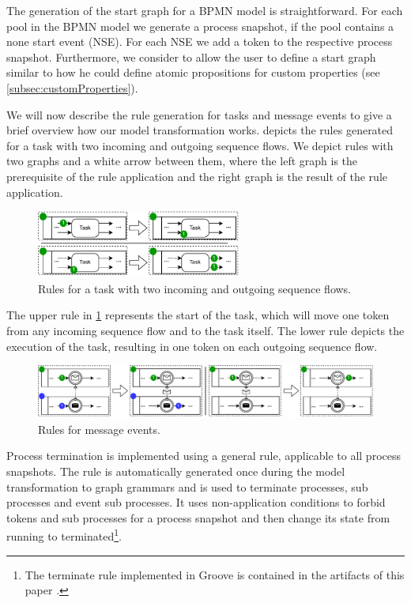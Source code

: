 \documentclass[adraft, copyright, creativecommons]{eptcs} %
\begin{document}
The generation of the start graph for a BPMN model is straightforward.
For each pool in the BPMN model we generate a process snapshot, if the pool contains a none start event (NSE).
For each NSE we add a token to the respective process snapshot.
Furthermore, we consider to allow the user to define a start graph similar to how he could define atomic propositions for custom properties (see \cref{subsec:customProperties}).

We will now describe the rule generation for tasks and message events to give a brief overview how our model transformation works.
 depicts the rules generated for a task with two incoming and outgoing sequence flows.
We depict rules with two graphs and a white arrow between them, where the left graph is the prerequisite of the rule application and the right graph is the result of the rule application.
\begin{figure}[h]
    \centering
    \includegraphics[width=0.6\textwidth]{images/bpmn_semantics-task-rules.pdf}
    \caption{Rules for a task with two incoming and outgoing sequence flows.}
    \label{fig:taskRules}
\end{figure}

The upper rule in \cref{fig:taskRules} represents the start of the task, which will move one token from any incoming sequence flow and to the task itself.
The lower rule depicts the execution of the task, resulting in one token on each outgoing sequence flow.

\begin{figure}[h]
    \centering
    \includegraphics[width=1\textwidth]{images/bpmn_semantics-message-events.pdf}
    \caption{Rules for message events.}
    \label{fig:messageEventRules}
\end{figure}

Process termination is implemented using a general rule, applicable to all process snapshots.
The rule is automatically generated once during the model transformation to graph grammars and is used to terminate processes, sub processes and event sub processes.
It uses non-application conditions to forbid tokens and sub processes for a process snapshot and then change its state from running to terminated\footnote{The terminate rule implemented in Groove is contained in the artifacts of this paper \cite{timkrauterArtifactsTERMGRAPH2022}.}.
\end{document}
